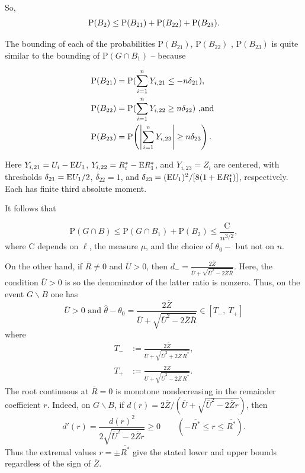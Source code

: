 So,
\begin{equation}
	\mathrm{P}(B_{2})\leq \mathrm{P}(B_{21})+\mathrm{P}(B_{22})+\mathrm{P}(B_{23}).
\end{equation}

The bounding of each of the probabilities $\mathrm{P}(B_{21})$, $\mathrm{P}(B_{22})$ , $\mathrm{P}(B_{23})$ is quite similar to the bounding of $\mathrm{P}(G\cap B_{1})$ -- because 

\begin{align*}
	\mathrm{P}(B_{21})&=\mathrm{P}(\sum_{i=1}^{n}Y_{i,21}\leq-n\delta_{21}), \\
	\mathrm{P}(B_{22})&=\mathrm{P}(\sum_{i=1}^{n}Y_{i,22}\geq n\delta_{22}) \textrm{ ,and } \\ 
	\mathrm{P}(B_{23})&= \mathrm{P}\!\left(\left|\sum_{i=1}^{n}Y_{i,23}\right|\geq n\delta_{23}\right).
\end{align*} 

Here $Y_{i,21}=U_i-\mathrm{E} U_1$, $Y_{i,22}=R_i^*-\mathrm{E} R_1^*$, and $Y_{i,23}=Z_i$ are centered, with thresholds $\delta_{21}=\mathrm{E} U_1/2$, $\delta_{22}=1$, and $\delta_{23}=(\mathrm{E} U_1)^2/[8(1+\mathrm{E} R_1^*)]$, respectively. Each has finite third absolute moment.

It follows that

\begin{equation}\label{GandB}
	\mathrm{P}(G\cap B)\leq \mathrm{P}(G\cap B_{1})+\mathrm{P}(B_{2})\leq\frac{\mathrm{C}}{n^{3/2}}, 
\end{equation}
where $\mathrm{C}$ depends on $\ell$, the measure $\mu$, and the choice of $\theta_{0}-$ but not on $n.$


On the other hand, if $\overline{R}\neq 0$ and $\overline{U}>0$, then $d_{-}=\displaystyle \frac{2\overline{Z}}{\overline{U}+\sqrt{\overline{U}^{2}-2\overline{Z}\overline{R}}}$. Here, the condition $\overline{U}>0$ is so the denominator of the latter ratio is nonzero. Thus, on the event $G\backslash B$ one has
\begin{equation}\label{inclusionrelation}
	\overline{U}>0 \textrm{ and } \displaystyle \hat{\theta}-\theta_{0}=\frac{2\overline{Z}}{\overline{U}+\sqrt{\overline{U}^{2}-2\overline{Z}\overline{R}}}\in[T_{-},\ T_{+}]
\end{equation}
where
\begin{equation}\label{Tpm}
\begin{aligned}
T_-&:=\frac{2\overline{Z}}{\overline{U}+\sqrt{\overline{U}^{2}+2\overline{Z}\,\overline{R^{*}}}},\\
T_+&:=\frac{2\overline{Z}}{\overline{U}+\sqrt{\overline{U}^{2}-2\overline{Z}\,\overline{R^{*}}}}.
\end{aligned}
\end{equation}
The root continuous at $\overline{R}=0$ is monotone nondecreasing in the remainder coefficient $r$. Indeed, on $G\backslash B$, if
$d(r)=2\overline{Z}/(\overline{U}+\sqrt{\overline{U}^{2}-2\overline{Z}r})$, then
\[
d'(r)=\frac{d(r)^2}{2\sqrt{\overline{U}^{2}-2\overline{Z}r}}\geq0
\qquad(-\overline{R^*}\leq r\leq\overline{R^*}).
\]
Thus the extremal values $r=\pm\overline{R^*}$ give the stated lower and upper bounds regardless of the sign of $\overline{Z}$.

